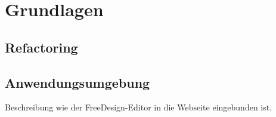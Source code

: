 \chapter{Grundlagen}


\section{Refactoring}



\section{Anwendungsumgebung}
Beschreibung wie der FreeDesign-Editor in die Webseite eingebunden ist.




